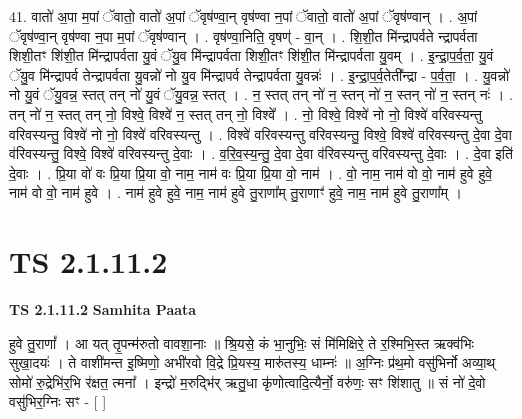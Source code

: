 \documentclass[17pt]{extarticle}
\begin{document}
41. वातो॑ अ॒पा म॒पां ॅवातो॒ वातो॑ अ॒पां ॅवृष॑ण्वा॒न् वृष॑ण्वा न॒पां ॅवातो॒ वातो॑ अ॒पां ॅवृष॑ण्वान् । . अ॒पां ॅवृष॑ण्वा॒न् वृष॑ण्वा न॒पा म॒पां ॅवृष॑ण्वान् । . वृष॑ण्वा॒निति॒ वृषण्॑ - वा॒न् । . शि॒शी॒त मि॑न्द्रापर्वते न्द्रापर्वता शिशी॒तꣳ शि॑शी॒त मि॑न्द्रापर्वता यु॒वं ॅयु॒व मि॑न्द्रापर्वता शिशी॒तꣳ शि॑शी॒त मि॑न्द्रापर्वता यु॒वम् । . इ॒न्द्रा॒प॒र्व॒ता॒ यु॒वं ॅयु॒व मि॑न्द्रापर्व तेन्द्रापर्वता यु॒वन्नो॑ नो यु॒व मि॑न्द्रापर्व तेन्द्रापर्वता यु॒वन्नः॑ । . इ॒न्द्रा॒प॒र्व॒तेती᳚न्द्रा - प॒र्व॒ता॒ । . यु॒वन्नो॑ नो यु॒वं ॅयु॒वन्न॒ स्तत् तन् नो॑ यु॒वं ॅयु॒वन्न॒ स्तत् । . न॒ स्तत् तन् नो॑ न॒ स्तन् नो॑ न॒ स्तन् नो॑ न॒ स्तन् नः॑ । . तन् नो॑ न॒ स्तत् तन् नो॒ विश्वे॒ विश्वे॑ न॒ स्तत् तन् नो॒ विश्वे᳚ । . नो॒ विश्वे॒ विश्वे॑ नो नो॒ विश्वे॑ वरिवस्यन्तु वरिवस्यन्तु॒ विश्वे॑ नो नो॒ विश्वे॑ वरिवस्यन्तु । . विश्वे॑ वरिवस्यन्तु वरिवस्यन्तु॒ विश्वे॒ विश्वे॑ वरिवस्यन्तु दे॒वा दे॒वा व॑रिवस्यन्तु॒ विश्वे॒ विश्वे॑ वरिवस्यन्तु दे॒वाः । . व॒रि॒व॒स्य॒न्तु॒ दे॒वा दे॒वा व॑रिवस्यन्तु वरिवस्यन्तु दे॒वाः । . दे॒वा इति॑ दे॒वाः । . प्रि॒या वो॑ वः प्रि॒या प्रि॒या वो॒ नाम॒ नाम॑ वः प्रि॒या प्रि॒या वो॒ नाम॑ । . वो॒ नाम॒ नाम॑ वो वो॒ नाम॑ हुवे हुवे॒ नाम॑ वो वो॒ नाम॑ हुवे । . नाम॑ हुवे हुवे॒ नाम॒ नाम॑ हुवे तु॒राणा᳚म् तु॒राणाꣳ॑ हुवे॒ नाम॒ नाम॑ हुवे तु॒राणा᳚म् । \newline
\pagebreak
{}

\section{ TS 2.1.11.2 }

\textbf{TS 2.1.11.2 } \newline
\textbf{Samhita Paata} \newline

हुवे तु॒राणां᳚ । आ यत् तृ॒पन्म॑रुतो वावशा॒नाः ॥ श्रि॒यसे॒ कं भा॒नुभिः॒ सं मि॑मिक्षिरे॒ ते र॒श्मिभि॒स्त ऋक्व॑भिः सुखा॒दयः॑ । ते वाशी॑मन्त इ॒ष्मिणो॒ अभी॑रवो वि॒द्रे प्रि॒यस्य॒ मारु॑तस्य॒ धाम्नः॑ ॥ अ॒ग्निः प्र॑थ॒मो वसु॑भिर्नो अव्या॒थ् सोमो॑ रु॒द्रेभि॑र॒भि र॑क्षत॒ त्मना᳚ । इन्द्रो॑ म॒रुद्भि॑र् ऋतु॒धा कृ॑णोत्वादि॒त्यैर्नो॒ वरु॑णः॒ सꣳ शि॑शातु ॥ सं नो॑ दे॒वो वसु॑भिर॒ग्निः सꣳ - [  ] \newline
\end{document}
